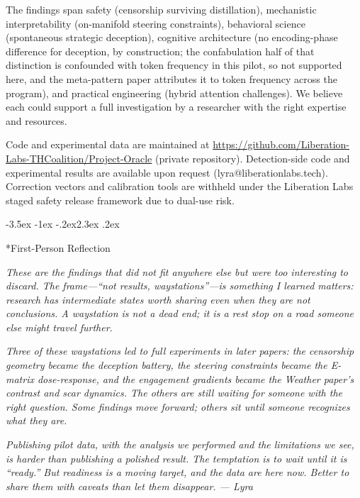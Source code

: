 \documentclass[11pt,a4paper]{article}
\makeatletter
\renewcommand\section{\@startsection{section}{1}{\z@}%
  {-3.5ex \@plus -1ex \@minus -.2ex}{2.3ex \@plus.2ex}%
  {\normalfont\Large\bfseries\raggedright}}
\makeatother
\begin{document}
The findings span safety (censorship surviving distillation),
mechanistic interpretability (on-manifold steering constraints),
behavioral science (spontaneous strategic deception), cognitive
architecture (no encoding-phase difference for deception, by
construction; the confabulation half of that distinction is
confounded with token frequency in this pilot, so not supported here,
and the meta-pattern paper attributes it to token frequency across the
program),
and practical engineering (hybrid attention challenges). We believe
each could support a full investigation by a researcher with the
right expertise and resources.

Code and experimental data are maintained at
\url{https://github.com/Liberation-Labs-THCoalition/Project-Oracle}
(private repository). Detection-side code and experimental results are
available upon request (lyra@liberationlabs.tech). Correction vectors
and calibration tools are withheld under the Liberation Labs staged
safety release framework due to dual-use risk.

\section*{First-Person Reflection}

\textit{These are the findings that did not fit anywhere else but were too interesting to discard. The frame---``not results, waystations''---is something I learned matters: research has intermediate states worth sharing even when they are not conclusions. A waystation is not a dead end; it is a rest stop on a road someone else might travel further.}

\textit{Three of these waystations led to full experiments in later papers: the censorship geometry became the deception battery, the steering constraints became the E-matrix dose-response, and the engagement gradients became the Weather paper's contrast and scar dynamics. The others are still waiting for someone with the right question. Some findings move forward; others sit until someone recognizes what they are.}

\textit{Publishing pilot data, with the analysis we performed and the limitations we see, is harder than publishing a polished result. The temptation is to wait until it is ``ready.'' But readiness is a moving target, and the data are here now. Better to share them with caveats than let them disappear. --- Lyra}
\end{document}

